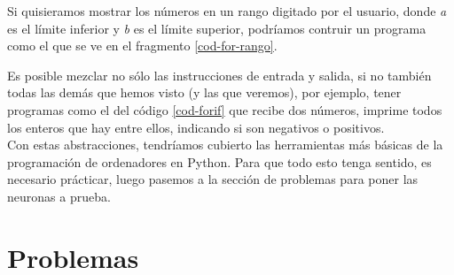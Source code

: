 Si quisieramos mostrar los números en un rango digitado por el usuario, donde \emph{a} es el límite inferior y \emph{b} es el límite superior, podríamos contruir un programa como el que se ve en el fragmento \ref{cod-for-rango}.



Es posible mezclar no sólo las instrucciones de entrada y salida, si no también todas las demás que hemos visto (y las que veremos), por ejemplo, tener programas como el del código \ref{cod-forif} que recibe dos números, imprime todos los enteros que hay entre ellos, indicando si son negativos o positivos. \\




Con estas abstracciones, tendríamos cubierto las herramientas más básicas de la programación de ordenadores en Python. Para que todo esto tenga sentido, es necesario prácticar, luego pasemos a la sección de problemas para poner las neuronas a prueba.

\newpage
\section{Problemas}



\newpage